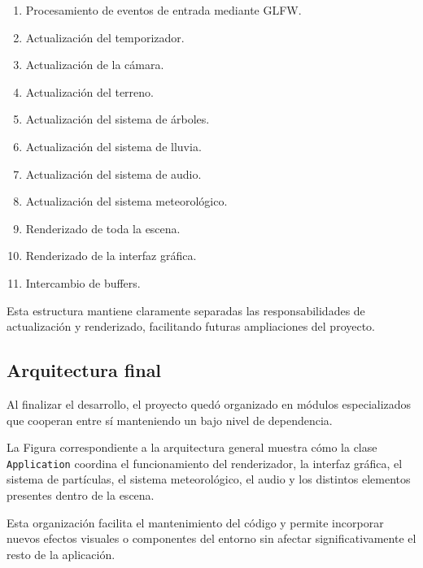 \begin{enumerate}

\item Procesamiento de eventos de entrada mediante GLFW.

\item Actualización del temporizador.

\item Actualización de la cámara.

\item Actualización del terreno.

\item Actualización del sistema de árboles.

\item Actualización del sistema de lluvia.

\item Actualización del sistema de audio.

\item Actualización del sistema meteorológico.

\item Renderizado de toda la escena.

\item Renderizado de la interfaz gráfica.

\item Intercambio de buffers.

\end{enumerate}

Esta estructura mantiene claramente separadas las responsabilidades de actualización y renderizado, facilitando futuras ampliaciones del proyecto.

\subsection{Arquitectura final}

Al finalizar el desarrollo, el proyecto quedó organizado en módulos especializados que cooperan entre sí manteniendo un bajo nivel de dependencia.

La Figura correspondiente a la arquitectura general muestra cómo la clase \texttt{Application} coordina el funcionamiento del renderizador, la interfaz gráfica, el sistema de partículas, el sistema meteorológico, el audio y los distintos elementos presentes dentro de la escena.

Esta organización facilita el mantenimiento del código y permite incorporar nuevos efectos visuales o componentes del entorno sin afectar significativamente el resto de la aplicación.